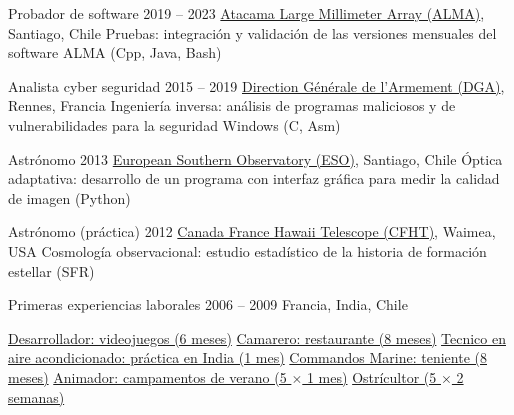 \begin{joblist}[\tbfwidth][8.4][\tbfyeary]

\setlength{\parskip}{0.3cm}
\vspace{-0.4cm}

\item[Probador de software]{2019 -- 2023}
  {
  \href{https://www.almaobservatory.org}{Atacama Large Millimeter Array (ALMA)}, Santiago, Chile
  }
  {Pruebas: integración y validación de las versiones mensuales del software ALMA (Cpp, Java, Bash)}

\item[Analista cyber seguridad]{2015 -- 2019}
  {
  \href{http://www.defense.gouv.fr/dga/}{Direction Générale de l'Armement (DGA)}, Rennes, Francia
  }
  {Ingeniería inversa: análisis de programas maliciosos y de vulnerabilidades para la seguridad Windows (C, Asm)}




\item[Astrónomo]{2013}
    {
    \href{http://www.eso.org/public/}{European Southern Observatory (ESO)}, Santiago, Chile
    }
    {Óptica adaptativa: desarrollo de un programa con interfaz gráfica para medir la calidad de imagen (Python)}

\item[Astrónomo (práctica)]{2012}
  {
\href{https://www.cfht.hawaii.edu/}{Canada France Hawaii Telescope (CFHT)}, Waimea, USA
  }
  {Cosmología observacional: estudio estadístico de la historia de formación estellar (SFR)}

\item[Primeras experiencias laborales]{2006 -- 2009}
  {
  Francia, India, Chile
  }
  {
    \renewcommand\labelitemi{{}}
    \vspace{-0.8cm}
    \setlength{\parskip}{0cm}
    \begin{itemize}[leftmargin=*, label=\textbullet]
    \setlength\itemsep{0cm}

    \cvitem \href{https://tinmarino.github.io}{Desarrollador: videojuegos (6 meses)}
    \cvitem \href{http://www.insertcoin.cl/}{Camarero: restaurante (8 meses)}
    \cvitem \href{http://www.dupont.co.in/}{Tecnico en aire acondicionado: práctica en India (1 mes)}
    \cvitem \href{http://www.defense.gouv.fr/marine/organisation/forces/fusiliers-marins-et-commandos/force-maritime-des-fusiliers-marins-et-commandos}{Commandos Marine: teniente (8 meses)}
    \cvitem \href{http://www.vacances-pour-tous.org/}{Animador: campamentos de verano (5 $\times$ 1 mes)}
    \cvitem \href{http://huitresdesaintvaast.fr/}{Ostrícultor (5 $\times$ 2 semanas)}
    \end{itemize}
  }
\end{joblist}


\ifx\HCode\undefined
\else
\fi




